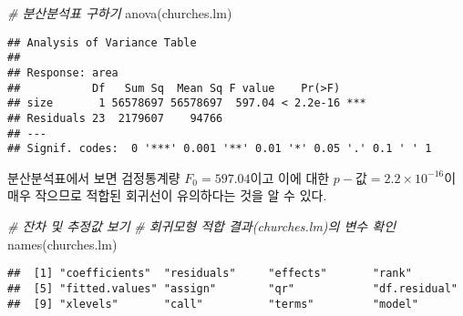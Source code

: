 \documentclass[
]{article}
\newenvironment{Shaded}{\begin{snugshade}}{\end{snugshade}}
\newcommand{\CommentTok}[1]{\textcolor[rgb]{0.56,0.35,0.01}{\textit{#1}}}
\newcommand{\FunctionTok}[1]{\textcolor[rgb]{0.00,0.00,0.00}{#1}}
\newcommand{\NormalTok}[1]{#1}
\newcommand{\SpecialCharTok}[1]{\textcolor[rgb]{0.00,0.00,0.00}{#1}}
\begin{document}
\begin{Shaded}
\begin{Highlighting}[]
\CommentTok{\# 분산분석표 구하기}
\FunctionTok{anova}\NormalTok{(churches.lm)}
\end{Highlighting}
\end{Shaded}

\begin{verbatim}
## Analysis of Variance Table
## 
## Response: area
##           Df   Sum Sq  Mean Sq F value    Pr(>F)    
## size       1 56578697 56578697  597.04 < 2.2e-16 ***
## Residuals 23  2179607    94766                      
## ---
## Signif. codes:  0 '***' 0.001 '**' 0.01 '*' 0.05 '.' 0.1 ' ' 1
\end{verbatim}

분산분석표에서 보면 검정통계량 \(F_0=597.04\)이고 이에 대한
\(p-값=2.2\times10^{-16}\)이 매우 작으므로 적합된 회귀선이 유의하다는
것을 알 수 있다.

\begin{Shaded}
\begin{Highlighting}[]
\CommentTok{\# 잔차 및 추정값 보기}
\CommentTok{\# 회귀모형 적합 결과(churches.lm)의 변수 확인}
\FunctionTok{names}\NormalTok{(churches.lm)}
\end{Highlighting}
\end{Shaded}

\begin{verbatim}
##  [1] "coefficients"  "residuals"     "effects"       "rank"         
##  [5] "fitted.values" "assign"        "qr"            "df.residual"  
##  [9] "xlevels"       "call"          "terms"         "model"
\end{verbatim}

\begin{Shaded}
\end{Shaded}
\end{document}
